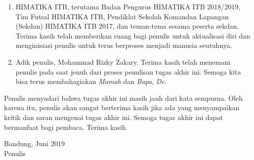 \begin{terimakasih}
\begin{enumerate}
    \item HIMATIKA ITB, terutama Badan Pengurus HIMATIKA ITB 2018/2019, Tim Futsal HIMATIKA ITB, Pendiklat Sekolah Komandan Lapangan (Sekdan) HIMATIKA ITB 2017, dan teman-tema sesama peserta sekdan. Terima kasih telah memberikan ruang bagi penulis untuk aktualisasi diri dan menginisiasi penulis untuk terus berproses menjadi manusia seutuhnya.
    \item Adik penulis, Mohammad Rizky Zakary. Terima kasih telah menemani penulis pada saat jenuh dari proses penulisan tugas akhir ini. Semoga kita bisa terus membahagiakan \textit{Mamah} dan \textit{Bapa}, \textit{De}.
\end{enumerate}

\noindent Penulis menyadari bahwa tugas akhir ini masih jauh dari kata sempurna. Oleh karena itu, penulis akan sangat berterima kasih jika ada yang menyampaikan kritik dan saran mengenai tugas akhir ini. Semoga tugas akhir ini dapat bermanfaat bagi pembaca. Terima kasih

\flushright
Bandung, Juni 2019\\
Penulis
\end{terimakasih}